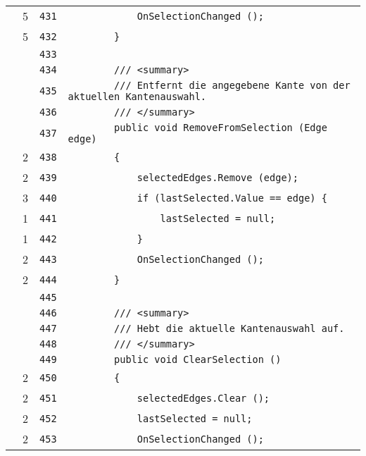 \documentclass[a4paper,10pt]{article}
\begin{document}
\begin{longtable}[l]{lrrl}
\cellcolor{green} & 5 & \verb~431~ & \verb~            OnSelectionChanged ();~\\
\cellcolor{green} & 5 & \verb~432~ & \verb~        }~\\
\cellcolor{gray} &  & \verb~433~ & \verb~~\\
\cellcolor{gray} &  & \verb~434~ & \verb~        /// <summary>~\\
\cellcolor{gray} &  & \verb~435~ & \verb~        /// Entfernt die angegebene Kante von der aktuellen Kantenauswahl.~\\
\cellcolor{gray} &  & \verb~436~ & \verb~        /// </summary>~\\
\cellcolor{gray} &  & \verb~437~ & \verb~        public void RemoveFromSelection (Edge edge)~\\
\cellcolor{green} & 2 & \verb~438~ & \verb~        {~\\
\cellcolor{green} & 2 & \verb~439~ & \verb~            selectedEdges.Remove (edge);~\\
\cellcolor{green} & 3 & \verb~440~ & \verb~            if (lastSelected.Value == edge) {~\\
\cellcolor{green} & 1 & \verb~441~ & \verb~                lastSelected = null;~\\
\cellcolor{green} & 1 & \verb~442~ & \verb~            }~\\
\cellcolor{green} & 2 & \verb~443~ & \verb~            OnSelectionChanged ();~\\
\cellcolor{green} & 2 & \verb~444~ & \verb~        }~\\
\cellcolor{gray} &  & \verb~445~ & \verb~~\\
\cellcolor{gray} &  & \verb~446~ & \verb~        /// <summary>~\\
\cellcolor{gray} &  & \verb~447~ & \verb~        /// Hebt die aktuelle Kantenauswahl auf.~\\
\cellcolor{gray} &  & \verb~448~ & \verb~        /// </summary>~\\
\cellcolor{gray} &  & \verb~449~ & \verb~        public void ClearSelection ()~\\
\cellcolor{green} & 2 & \verb~450~ & \verb~        {~\\
\cellcolor{green} & 2 & \verb~451~ & \verb~            selectedEdges.Clear ();~\\
\cellcolor{green} & 2 & \verb~452~ & \verb~            lastSelected = null;~\\
\cellcolor{green} & 2 & \verb~453~ & \verb~            OnSelectionChanged ();~\\

\end{longtable}
\end{document}
